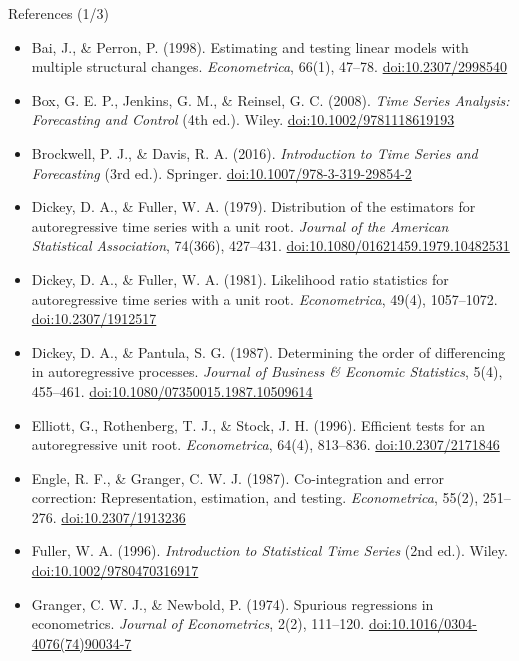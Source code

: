 \begin{frame}{References (1/3)}
\itemsize{\scriptsize}
\begin{itemize}
    \item Bai, J., \& Perron, P. (1998). Estimating and testing linear models with multiple structural changes. \textit{Econometrica}, 66(1), 47--78. \href{https://doi.org/10.2307/2998540}{doi:10.2307/2998540}
    \item Box, G. E. P., Jenkins, G. M., \& Reinsel, G. C. (2008). \textit{Time Series Analysis: Forecasting and Control} (4th ed.). Wiley. \href{https://doi.org/10.1002/9781118619193}{doi:10.1002/9781118619193}
    \item Brockwell, P. J., \& Davis, R. A. (2016). \textit{Introduction to Time Series and Forecasting} (3rd ed.). Springer. \href{https://doi.org/10.1007/978-3-319-29854-2}{doi:10.1007/978-3-319-29854-2}
    \item Dickey, D. A., \& Fuller, W. A. (1979). Distribution of the estimators for autoregressive time series with a unit root. \textit{Journal of the American Statistical Association}, 74(366), 427--431. \href{https://doi.org/10.1080/01621459.1979.10482531}{doi:10.1080/01621459.1979.10482531}
    \item Dickey, D. A., \& Fuller, W. A. (1981). Likelihood ratio statistics for autoregressive time series with a unit root. \textit{Econometrica}, 49(4), 1057--1072. \href{https://doi.org/10.2307/1912517}{doi:10.2307/1912517}
    \item Dickey, D. A., \& Pantula, S. G. (1987). Determining the order of differencing in autoregressive processes. \textit{Journal of Business \& Economic Statistics}, 5(4), 455--461. \href{https://doi.org/10.1080/07350015.1987.10509614}{doi:10.1080/07350015.1987.10509614}
    \item Elliott, G., Rothenberg, T. J., \& Stock, J. H. (1996). Efficient tests for an autoregressive unit root. \textit{Econometrica}, 64(4), 813--836. \href{https://doi.org/10.2307/2171846}{doi:10.2307/2171846}
    \item Engle, R. F., \& Granger, C. W. J. (1987). Co-integration and error correction: Representation, estimation, and testing. \textit{Econometrica}, 55(2), 251--276. \href{https://doi.org/10.2307/1913236}{doi:10.2307/1913236}
    \item Fuller, W. A. (1996). \textit{Introduction to Statistical Time Series} (2nd ed.). Wiley. \href{https://doi.org/10.1002/9780470316917}{doi:10.1002/9780470316917}
    \item Granger, C. W. J., \& Newbold, P. (1974). Spurious regressions in econometrics. \textit{Journal of Econometrics}, 2(2), 111--120. \href{https://doi.org/10.1016/0304-4076(74)90034-7}{doi:10.1016/0304-4076(74)90034-7}
\end{itemize}
\end{frame}

